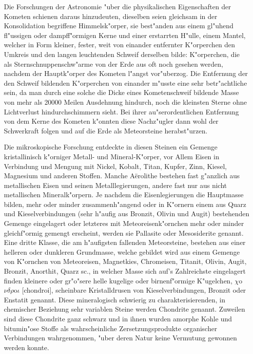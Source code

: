 \documentclass[a4paper, 11pt, oneside]{article}
\begin{document}
Die Forschungen der Astronomie "uber die physikalischen Eigenschaften der Kometen schienen daraus hinzudeuten, dieselben seien gleichsam in der Konsolidation begriffene Himmelsk"orper, sie best"anden aus einem gl"uhend fl"ussigen oder dampff"ormigen Kerne und einer erstarrten H"ulle, einem Mantel, welcher in Form kleiner, fester, weit von einander entfernter K"orperchen den Umkreis und den langen leuchtenden Schweif derselben bilde: K"orperchen, die als Sternschnuppenschw"arme von der Erde aus oft noch gesehen werden, nachdem der Hauptk"orper des Kometen l"angst vor"uberzog. Die Entfernung der den Schweif bildenden K"orperchen von einander m"usste eine sehr betr"achtliche sein, da man durch eine solche die Dicke eines Kometenschweif bildende Masse von mehr als 20000 Meilen Ausdehnung hindurch, noch die kleinsten Sterne ohne Lichtverlust hindurchschimmern sieht. Bei ihrer au"serordentlichen Entfernung von dem Kerne des Kometen k"onnten diese Nachz"ugler dann wohl der Schwerkraft folgen und auf die Erde als Meteorsteine herabst"urzen.

Die mikroskopische Forschung entdeckte in diesen Steinen ein Gemenge kristallinisch k"orniger Metall- und Mineral-K"orper, vor Allem Eisen in Verbindung und Mengung mit Nickel, Kobalt, Titan, Kupfer, Zinn, Kiesel, Magnesium und anderen Stoffen. Manche Aërolithe bestehen fast g"anzlich aus metallischen Eisen und seinen Metalllegierungen, andere fast nur aus nicht metallischen Mineralk"orpern. Je nachdem die Eisenlegierungen die Hauptmasse bilden, mehr oder minder zusammenh"angend oder in K"ornern einem aus Quarz und Kieselverbindungen (sehr h"aufig aus Bronzit, Olivin und Augit) bestehenden Gemenge eingelagert oder letzteres mit Meteoreisenk"ornchen mehr oder minder gleichf"ormig gemengt erscheint, werden sie Pallasite oder Mesosiderite genannt. Eine dritte Klasse, die am h"aufigsten fallenden Meteorsteine, bestehen aus einer helleren oder dunkleren Grundmasse, welche gebildet wird aus einem Gemenge von K"ornchen von Meteoreisen, Magnetkies, Chromeisen, Titanit, Olivin, Augit, Bronzit, Anorthit, Quarz sc., in welcher Masse sich auf's Zahlreichste eingelagert finden kleinere oder gr"o"sere helle kugelige oder birnenf"ormige K"ugelchen, $\chi$o$\nu\delta\rho$o$\iota$ [chondroi], scheinbare Kristalldrusen von Kieselverbindungen, Bronzit oder Enstatit genannt. Diese mineralogisch schwierig zu charakterisierenden, in chemischer Beziehung sehr variablen Steine werden Chondrite genannt. Zuweilen sind diese Chondrite ganz schwarz und in ihnen wurden amorphe Kohle und bitumin"ose Stoffe als wahrscheinliche Zersetzungsprodukte organischer Verbindungen wahrgenommen, "uber deren Natur keine Vermutung gewonnen werden konnte.
\end{document}
